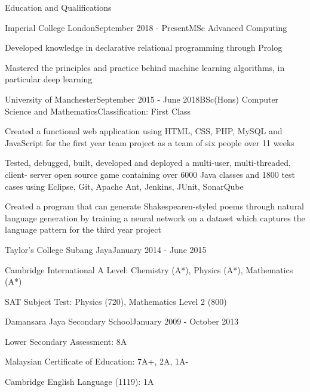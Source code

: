 \documentclass{resume} %
\begin{document}

\begin{rSection}{Education and Qualifications}

\begin{rSubsection}{Imperial College London}{September 2018 - Present}{MSc Advanced Computing}{}
\item Developed knowledge in declarative relational programming through Prolog
\item Mastered the principles and practice behind machine learning algorithms, in particular deep learning
\end{rSubsection}


\begin{rSubsection}{University of Manchester}{September 2015 - June 2018}{BSc(Hons) Computer Science and Mathematics}{Classification: First Class}
\item Created a functional web application using HTML, CSS, PHP, MySQL and JavaScript for the first year team project as a team of six people over 11 weeks
\item Tested, debugged, built, developed and deployed a multi-user, multi-threaded, client-
server open source game containing over 6000 Java classes and 1800 test cases using
Eclipse, Git, Apache Ant, Jenkins, JUnit, SonarQube
\item Created a program that can generate Shakespearen-styled poems through natural language generation by training a neural network on a dataset which captures the language pattern for the third year project
\end{rSubsection}


\begin{rSubsection} {Taylor's College Subang Jaya}{January 2014 - June 2015}{}{}
\item[] Cambridge International A Level: Chemistry (A*), Physics (A*), Mathematics (A*)
\item[] SAT Subject Test: Physics (720), Mathematics Level 2 (800)
\end{rSubsection}


\begin{rSubsection} {Damansara Jaya Secondary School}{January 2009 - October 2013}{}{}
\item[] Lower Secondary Assessment: 8A
\item[] Malaysian Certificate of Education: 7A+, 2A, 1A-
\item[] Cambridge English Language (1119): 1A
\end{rSubsection}

\end{rSection}
\end{document}

